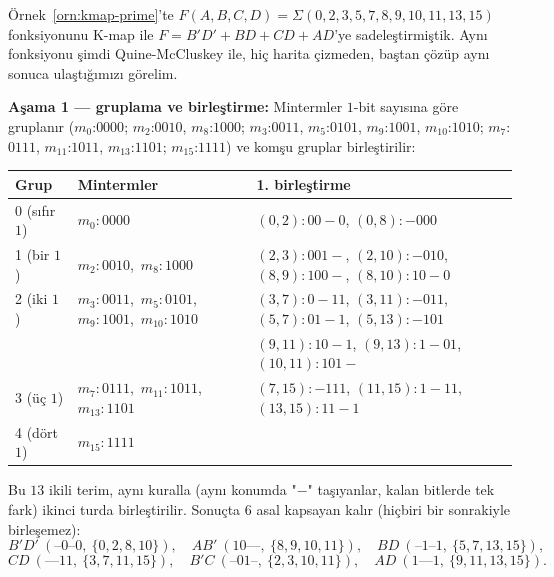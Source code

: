 \begin{ornek}\label{orn:qm-dogrulama}
Örnek~\ref{orn:kmap-prime}'te $F(A,B,C,D)=\Sigma(0,2,3,5,7,8,9,10,11,13,15)$
fonksiyonunu K-map ile $F=B'D'+BD+CD+AD$'ye sadeleştirmiştik. Aynı fonksiyonu şimdi
Quine-McCluskey ile, hiç harita çizmeden, baştan çözüp aynı sonuca ulaştığımızı
görelim.

\textbf{Aşama 1 --- gruplama ve birleştirme:} Mintermler $1$-bit sayısına göre
gruplanır ($m_0$:$0000$; $m_2$:$0010$, $m_8$:$1000$; $m_3$:$0011$, $m_5$:$0101$,
$m_9$:$1001$, $m_{10}$:$1010$; $m_7$:$0111$, $m_{11}$:$1011$, $m_{13}$:$1101$;
$m_{15}$:$1111$) ve komşu gruplar birleştirilir:
\begin{center}
\scriptsize
\begin{tabular}{lll}
\toprule
Grup & Mintermler & 1. birleştirme \\
\midrule
0 (sıfır $1$) & $m_0{:}0000$ & $(0,2){:}00{-}0$,\; $(0,8){:}{-}000$ \\
1 (bir $1$) & $m_2{:}0010$,\ $m_8{:}1000$ & $(2,3){:}001{-}$,\; $(2,10){:}{-}010$,\; $(8,9){:}100{-}$,\; $(8,10){:}10{-}0$ \\
2 (iki $1$) & $m_3{:}0011$,\ $m_5{:}0101$,\ $m_9{:}1001$,\ $m_{10}{:}1010$ &
$(3,7){:}0{-}11$,\; $(3,11){:}{-}011$,\; $(5,7){:}01{-}1$,\; $(5,13){:}{-}101$ \\
& & $(9,11){:}10{-}1$,\; $(9,13){:}1{-}01$,\; $(10,11){:}101{-}$ \\
3 (üç $1$) & $m_7{:}0111$,\ $m_{11}{:}1011$,\ $m_{13}{:}1101$ &
$(7,15){:}{-}111$,\; $(11,15){:}1{-}11$,\; $(13,15){:}11{-}1$ \\
4 (dört $1$) & $m_{15}{:}1111$ & \\
\bottomrule
\end{tabular}
\end{center}
Bu $13$ ikili terim, aynı kuralla (aynı konumda "$-$" taşıyanlar, kalan bitlerde tek
fark) ikinci turda birleştirilir. Sonuçta $6$ asal kapsayan kalır (hiçbiri bir
sonrakiyle birleşemez):
\[
B'D'\ (\text{--}0\text{--}0,\ \{0,2,8,10\}),\quad
AB'\ (10\text{--}\text{--},\ \{8,9,10,11\}),\quad
BD\ (\text{--}1\text{--}1,\ \{5,7,13,15\}),
\]
\[
CD\ (\text{--}\text{--}11,\ \{3,7,11,15\}),\quad
B'C\ (\text{--}01\text{--},\ \{2,3,10,11\}),\quad
AD\ (1\text{--}\text{--}1,\ \{9,11,13,15\}).
\]


\end{ornek}
